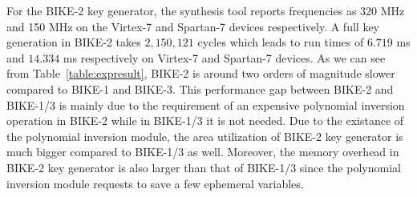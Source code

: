 \documentclass[runningheads]{llncs}
\begin{document}
For the BIKE-2 key generator, the synthesis tool reports
frequencies as 320 MHz and 150 MHz on the Virtex-7 and Spartan-7 devices respectively.
A full key generation in BIKE-2 takes $2,150,121$ cycles 
which leads to run times of $6.719$ ms and $14.334$ ms respectively
on Virtex-7 and Spartan-7 devices. 
As we can see from Table~\ref{table:expresult}, 
BIKE-2 is around two orders of magnitude slower compared to BIKE-1 and BIKE-3.  
This performance gap between BIKE-2 and BIKE-1/3 is mainly
due to the requirement of an expensive polynomial inversion operation in BIKE-2
while in BIKE-1/3 it is not needed. 
Due to the existance of the polynomial inversion module, 
the area utilization of BIKE-2 key generator is much 
bigger compared to BIKE-1/3 as well. 
Moreover, the memory overhead in BIKE-2 key generator
is also larger than that of BIKE-1/3 since 
the polynomial inversion module 
requests to save a few ephemeral variables.
\end{document}
